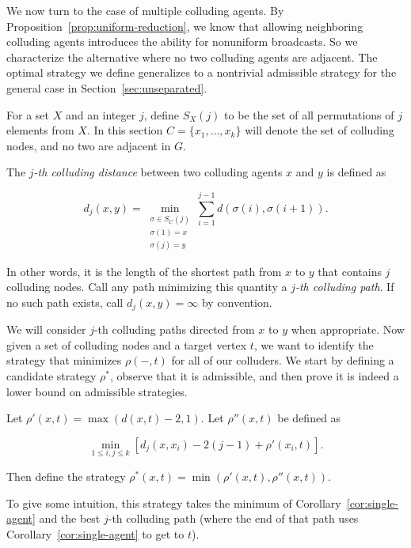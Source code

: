\documentclass[prodmode,acmec]{ec-acmsmall}
\begin{document}
We now turn to the case of multiple colluding agents. By
Proposition~\ref{prop:uniform-reduction}, we know that allowing neighboring
colluding agents introduces the ability for nonuniform broadcasts. So we
characterize the alternative where no two colluding agents are adjacent. The
optimal strategy we define generalizes to a nontrivial admissible strategy for
the general case in Section~\ref{sec:unseparated}.

For a set $X$ and an integer $j$, define $S_X(j)$ to be the set of all
permutations of $j$ elements from $X$. In this section $C = \{ x_1, \dots, x_k
\}$ will denote the set of colluding nodes, and no two are adjacent in $G$.

\begin{definition}
The \emph{$j$-th colluding distance} between two colluding agents $x$ and $y$
is defined as

\[
   d_j(x, y)= \min_{\substack{\sigma \in S_C(j) \\ \sigma(1) = x \\ \sigma(j) =
y}}
         \sum_{i=1}^{j-1} d(\sigma(i),\sigma(i+1)).
\]

In other words, it is the length of the shortest path from $x$ to $y$ that
contains $j$ colluding nodes. Call any path minimizing this quantity a
\emph{$j$-th colluding path}. If no such path exists, call $d_j(x,y) = \infty$
by convention.  \end{definition}

We will consider $j$-th colluding paths directed from $x$ to $y$ when
appropriate. Now given a set of colluding nodes and a target vertex $t$, we
want to identify the strategy that minimizes $\rho(-,t)$ for all of our
colluders. We start by defining a candidate strategy $\rho^*$, observe that it
is admissible, and then prove it is indeed a lower bound on admissible
strategies.

\begin{definition} \label{def:colluding-distance}
Let $\rho'(x,t) = \max(d(x,t) - 2, 1)$. Let $\rho''(x, t)$ be defined as

\[
   \min_{1 \leq i,j \leq k} \left [ d_j(x,x_i)-2(j-1) + \rho'(x_i, t) \right ].
\]

Then define the strategy $\rho^*(x,t)=\min(\rho'(x,t), \rho''(x, t))$.

\end{definition}

To give some intuition, this strategy takes the minimum of
Corollary~\ref{cor:single-agent} and the best $j$-th colluding path (where the
end of that path uses Corollary~\ref{cor:single-agent} to get to $t$).
\end{document}
